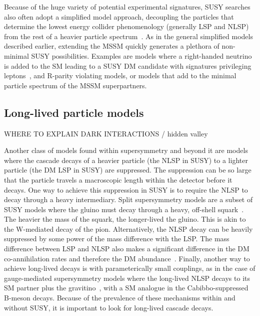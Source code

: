 
Because of the huge variety of potential experimental signatures, SUSY searches also often adopt a simplified model approach, 
decoupling the particles that determine the lowest energy collider phenomenology
(generally LSP and NLSP) from the rest of a heavier particle spectrum~\cite{Alves:2011wf}. 
As in the general simplified models described earlier, extending the MSSM quickly generates a plethora of non-minimal SUSY possibilities.
Examples are models where a right-handed neutrino is added to the SM leading to a SUSY DM candidate with signatures privileging leptons~\cite{Arina:2015uea},%
and R-parity violating models, 
or models that add to the minimal particle spectrum of the MSSM superpartners. 

\subsection{Long-lived particle models}
\label{sec:LLPModels}

WHERE TO EXPLAIN DARK INTERACTIONS / hidden valley


Another class of models found within supersymmetry and beyond it are models where the cascade decays of a heavier particle (the NLSP in SUSY) to a lighter particle (the DM LSP in SUSY) are suppressed. The suppression can be so large that the particle travels a macroscopic length within the detector before it decays. One way to achieve this suppression in SUSY is to require the NLSP to decay through a heavy intermediary. Split supersymmetry models are a subset of SUSY models where the gluino must decay through a heavy, off-shell squark~\cite{Masiero:2004ft}. The heavier the mass of the squark, the longer-lived the gluino. This is akin to the W-mediated decay of the pion. 
Alternatively, the NLSP decay can be heavily suppressed by some power of the mass difference with the LSP. The mass difference between LSP and NLSP also makes a significant difference in the DM co-annihilation rates and therefore the DM abundance~\cite{Ellis:1999mm}. Finally, another way to achieve long-lived decays is with parameterically small couplings, as in the case of gauge-mediated supersymmetry models where the long-lived NLSP decays to its SM partner plus the gravitino~\cite{Dimopoulos:1996vz}, with a SM analogue in the Cabibbo-suppressed B-meson decays. Because of the prevalence of these mechanisms within and without SUSY, it is important to look for long-lived cascade decays.


